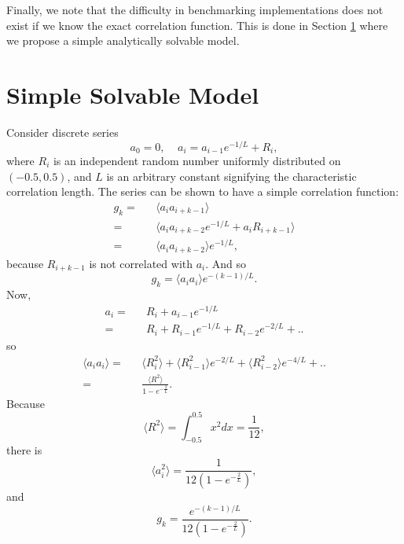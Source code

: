 Finally, we note that the difficulty in benchmarking implementations
does not exist if we know the exact correlation function. This is done
in Section \ref{sec:model} where we propose a simple analytically
solvable model.


\section{Simple Solvable Model}
\label{sec:model}

Consider discrete series
\begin{equation}
a_0 = 0, \;\;\;\; a_i = a_{i-1}e^{-1/L}+ R_{i},
\label{sequence}
\end{equation}
where $R_i$ is an independent random number uniformly distributed on
$(-0.5, 0.5)$, and $L$ is an arbitrary constant signifying the
characteristic correlation length. The series can be shown to have a
simple correlation function:
\begin{eqnarray} 
g_k =&& \langle a_{i} a_{i+k-1} \rangle \nonumber\\
    =&& \langle a_{i} a_{i+k-2}e^{-1/L}+a_i R_{i+k-1}
    \rangle \nonumber\\
    =&& \langle a_{i}a_{i+k-2} \rangle e^{-1/L},
\end{eqnarray}
because $R_{i+k-1}$ is not correlated with $a_i$. And so
\begin{equation} 
g_k = \langle a_{i}a_{i} \rangle e^{-(k-1)/L}.
\end{equation}
Now,
\begin{eqnarray} 
a_{i} =&& R_i+a_{i-1}e^{-1/L} \nonumber\\
      =&& R_i+R_{i-1}e^{-1/L}+R_{i-2}e^{-2/L}+.. 
\end{eqnarray}
so
\begin{eqnarray} 
\langle a_{i} a_{i} \rangle 
=&& \langle R_i^2 \rangle+\langle R_{i-1}^2 \rangle e^{-2/L}
+\langle R_{i-2}^2 \rangle e^{-4/L}+..  \nonumber\\
=&& \frac{\langle R^2 \rangle}{1-e^{-\frac{2}{L}}}. 
\end{eqnarray} 
Because 
$$
\langle R^2 \rangle = \int_{-0.5}^{0.5}x^2 dx = \frac{1}{12}, $$
there is
\begin{equation} 
\langle a_{i}^2 \rangle = \frac{1}{12(1-e^{-\frac{2}{L}})},
\end{equation}
and
\begin{equation} 
g_k = \frac{e^{-(k-1)/L}}{12(1-e^{-\frac{2}{L}})}.
\label{model_corr}
\end{equation}

